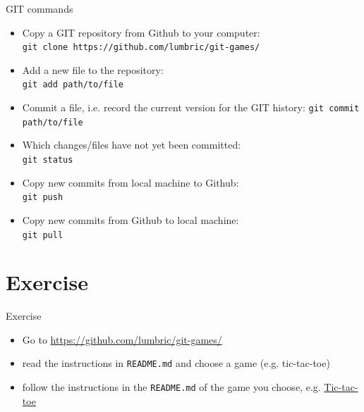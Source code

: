 \begin{frame}[fragile]{GIT commands}
    \begin{itemize}
        \item Copy a GIT repository from Github to your computer:\\
            \verb|git clone https://github.com/lumbric/git-games/|
        \item Add a new file to the repository:\\
            \verb|git add path/to/file|
        \item Commit a file, i.e. record the current version for the GIT history:
            \verb|git commit path/to/file|
        \item Which changes/files have not yet been committed:\\
            \verb|git status|
        \item Copy new commits from local machine to Github:\\
            \verb|git push|
        \item Copy new commits from Github to local machine:\\
            \verb|git pull|
    \end{itemize}
\end{frame}







\section{Exercise}

\begin{frame}[fragile]{Exercise}
    \begin{itemize}
        \item Go to \href{https://github.com/lumbric/git-games/}{https://github.com/lumbric/git-games/}
        \item read the instructions in \verb|README.md| and choose a game (e.g. tic-tac-toe)
        \item follow the instructions in the \verb|README.md| of the game you choose, e.g.
            \href{https://github.com/lumbric/git-games/tree/master/tic-tac-toe#how-to-play}{Tic-tac-toe}

    \end{itemize}
\end{frame}


